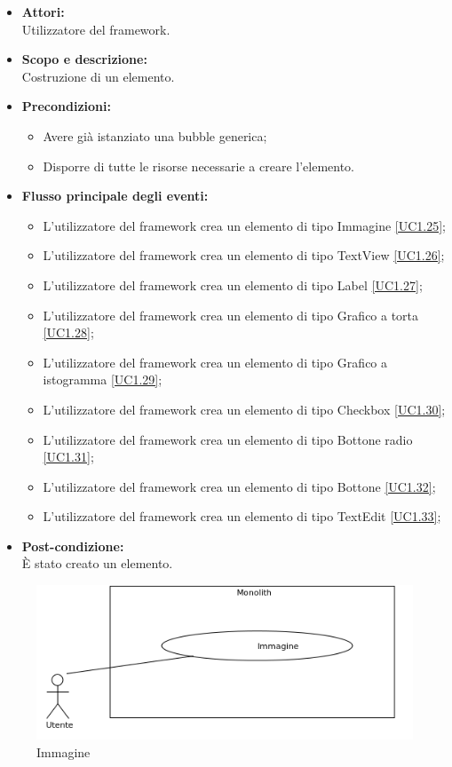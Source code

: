 \begin{itemize}
	\item \textbf{Attori:}
	\\Utilizzatore del framework.
	\item \textbf{Scopo e descrizione:} 
	\\Costruzione di un elemento.
	\item \textbf{Precondizioni:}
	\begin{itemize}
		\item Avere già istanziato una bubble generica;
		\item Disporre di tutte le risorse necessarie a creare l'elemento.
	\end{itemize}
	\item \textbf{Flusso principale degli eventi:}
	\begin{itemize}
		\item L'utilizzatore del framework crea un elemento di tipo Immagine \ref{UC1.25};
		\item L'utilizzatore del framework crea un elemento di tipo TextView \ref{UC1.26};
		\item L'utilizzatore del framework crea un elemento di tipo Label \ref{UC1.27};
		\item L'utilizzatore del framework crea un elemento di tipo Grafico a torta \ref{UC1.28};
		\item L'utilizzatore del framework crea un elemento di tipo Grafico a istogramma \ref{UC1.29};
		\item L'utilizzatore del framework crea un elemento di tipo Checkbox \ref{UC1.30};
		\item L'utilizzatore del framework crea un elemento di tipo Bottone radio \ref{UC1.31};
		\item L'utilizzatore del framework crea un elemento di tipo Bottone \ref{UC1.32};
		\item L'utilizzatore del framework crea un elemento di tipo TextEdit \ref{UC1.33}; 
	\end{itemize}
	\item \textbf{Post-condizione:}
	\\È stato creato un elemento.
\end{itemize}

\begin{samepage}
\nopagebreak
\begin{figure}[H]
	\centering
	\includegraphics[width=15cm]{../../documenti/AnalisiDeiRequisiti/Diagrammi_img/uc1_25.png}
	\caption{\UCFFCaption{} Immagine}
\end{figure}
\end{samepage}

